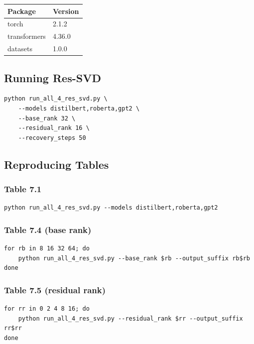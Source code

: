 \begin{table}[H]
\centering
\small
\begin{tabular}{ll}
\toprule
\textbf{Package} & \textbf{Version} \\
\midrule
torch & 2.1.2 \\
transformers & 4.36.0 \\
datasets & 1.0.0 \\
\bottomrule
\end{tabular}
\end{table}

\subsection{Running Res-SVD}

\begin{lstlisting}
python run_all_4_res_svd.py \
    --models distilbert,roberta,gpt2 \
    --base_rank 32 \
    --residual_rank 16 \
    --recovery_steps 50
\end{lstlisting}

\subsection{Reproducing Tables}

\subsubsection{Table 7.1}
\begin{lstlisting}
python run_all_4_res_svd.py --models distilbert,roberta,gpt2
\end{lstlisting}

\subsubsection{Table 7.4 (base rank)}
\begin{lstlisting}
for rb in 8 16 32 64; do
    python run_all_4_res_svd.py --base_rank $rb --output_suffix rb$rb
done
\end{lstlisting}

\subsubsection{Table 7.5 (residual rank)}
\begin{lstlisting}
for rr in 0 2 4 8 16; do
    python run_all_4_res_svd.py --residual_rank $rr --output_suffix rr$rr
done
\end{lstlisting}

